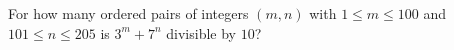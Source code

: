 For how many ordered pairs of integers $(m,n)$ with $1\le m\le100$ and $101\le n\le205$ is $3^m+7^n$ divisible by $10$?
